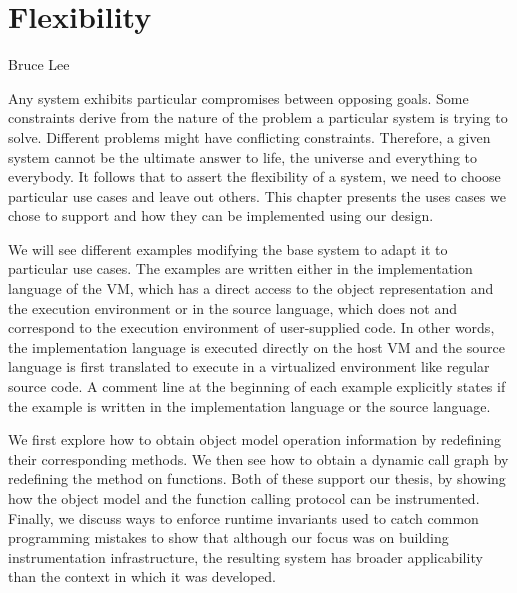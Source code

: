 \chapter{Flexibility}
\label{chap:Flexibility}

{Bruce Lee}

Any system exhibits particular compromises between opposing goals. Some
constraints derive from the nature of the problem a particular system is trying
to solve. Different problems might have conflicting constraints. Therefore, a
given system cannot be the ultimate answer to life, the universe and everything
to everybody. It follows that to assert the flexibility of a system, we need to
choose particular use cases and leave out others. This chapter presents the
uses cases we chose to support and how they can be implemented using our
design.


We will see different examples modifying the base system to adapt it to
particular use cases. The examples are written either in the implementation
language of the VM, which has a direct access to the object representation and
the execution environment or in the source language, which does not and
correspond to the execution environment of user-supplied code. In other words,
the implementation language is executed directly on the host VM and the source
language is first translated to execute in a virtualized environment like
regular source code. A comment line at the beginning of each example explicitly
states if the example is written in the implementation language or the source
language.

We first explore how to obtain object model operation information by redefining
their corresponding methods.  We then see how to obtain a dynamic call graph by
redefining the  method on functions. Both of these support our thesis,
by showing how the object model and the function calling protocol can be
instrumented. Finally, we discuss ways to enforce runtime invariants used to
catch common programming mistakes to show that although our focus was on
building instrumentation infrastructure, the resulting system has broader
applicability than the context in which it was developed.

